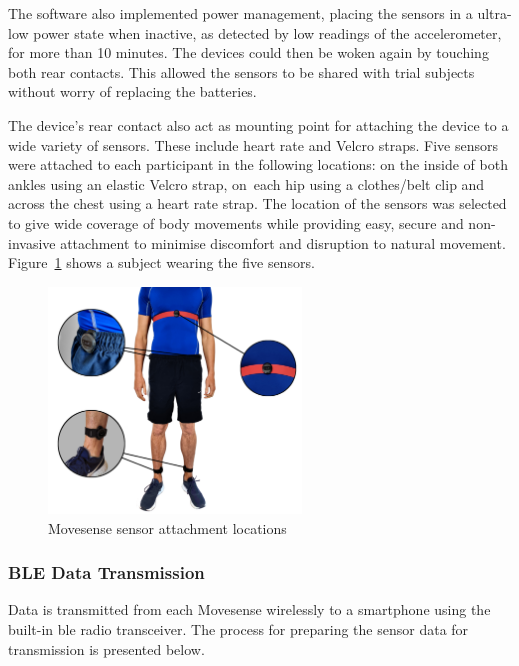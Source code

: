 The software also implemented power management, placing the sensors in a ultra-low power state when inactive, as detected by low readings of the accelerometer, for more than 10 minutes. The devices could then be woken again by touching both rear contacts. This allowed the sensors to be shared with trial subjects without worry of replacing the batteries.

The device's rear contact also act as mounting point for attaching the device to a wide variety of sensors. These include heart rate and Velcro straps. Five sensors were attached to each participant in the following locations: on the inside of both ankles using an elastic Velcro strap, on~each hip using a clothes/belt clip and across the chest using a heart rate strap. The location of the sensors was selected to give wide coverage of body movements while providing easy, secure and non-invasive attachment to minimise discomfort and disruption to natural movement. Figure~\ref{fig:methods-movesense-sensor-locations} shows a subject wearing the five sensors.

\begin{figure}[hbt]
    \centering
    \includegraphics[width=0.6\textwidth]{content/3-Methods/sensor_locations.png}
    \caption{Movesense sensor attachment locations \cite{Sherratt2021}}
    \label{fig:methods-movesense-sensor-locations}
\end{figure}


\subsubsection{BLE Data Transmission} %
\label{subsection:methods-on-sensor-compression}
Data is transmitted from each Movesense wirelessly to a smartphone using the built-in \acrfull{ble} radio transceiver. The process for preparing the sensor data for transmission is presented below.


